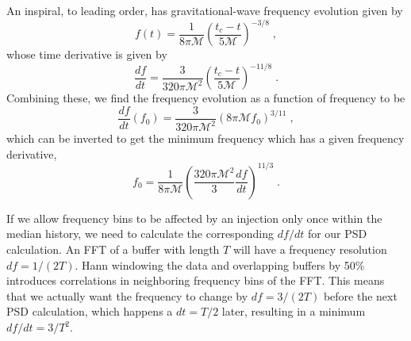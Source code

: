 \begin{center}
\end{center}

An inspiral, to leading order, has gravitational-wave frequency evolution given
by
\begin{equation}
f(t) = \frac{1}{8 \pi \mathcal{M}} \left( \frac{t_c - t}{5 \mathcal{M}} \right)^{-3/8}\;,
\end{equation}
whose time derivative is given by
\begin{equation}
\frac{df}{dt} = \frac{3}{320 \pi \mathcal{M}^2} \left( \frac{t_c - t}{5 \mathcal{M}} \right)^{-11/8}\;.
\end{equation}
Combining these, we find the frequency evolution as a function of frequency to
be
\begin{equation}
\frac{df}{dt}(f_0) = \frac{3}{320 \pi \mathcal{M}^2} \left( 8 \pi \mathcal{M} f_0 \right)^{3/11}\;,
\end{equation}
which can be inverted to get the minimum frequency which has a given frequency
derivative,
\begin{equation}
f_0 = \frac{1}{8 \pi \mathcal{M}} \left( \frac{320 \pi \mathcal{M}^2}{3} \frac{df}{dt} \right)^{11/3}\;.
\end{equation}

If we allow frequency bins to be affected by an injection only once within the
median history, we need to calculate the corresponding $df/dt$ for our PSD
calculation. An FFT of a buffer with length $T$ will have a frequency
resolution $df = 1/(2T)$. Hann windowing the data and overlapping buffers by
50\% introduces correlations in neighboring frequency bins of the FFT. This
means that we actually want the frequency to change by $df = 3/(2T)$ before the
next PSD calculation, which happens a $dt = T/2$ later, resulting in a minimum
$df/dt = 3/T^2$.

